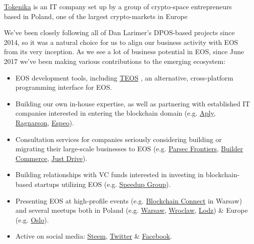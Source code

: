 \documentclass[10pt,a4paper,dateno,sigleft]{newlfm} %
\begin{document}
\begin{newlfm}


\href{http://tokenika.io/}{Tokenika} is an IT company set up by a group of crypto-space entrepreneurs based in Poland, one of the largest crypto-markets in Europe

We've been closely following all of Dan Larimer's DPOS-based projects since 2014, so it was a natural choice for us to align our business activity with EOS from its very inception. As we see a lot of business potential in EOS, since June 2017 we've been making various contributions to the emerging ecosystem:

\begin{itemize}
\item EOS development tools, including \href{https://github.com/tokenika/teos}{TEOS} , an alternative, cross-platform programming interface for EOS.
\item Building our own in-house expertise, as well as partnering with established IT companies interested in entering the blockchain domain (e.g. \href{https://aply.eu/}{Aply}, \href{https://ragnarson.com/}{Ragnarson}, \href{http://espeo.eu/}{Espeo}).
\item Consultation services for companies seriously considering building or migrating their large-scale businesses to EOS (e.g. \href{http://parsecfrontiers.com/}{Parsec Frontiers}, \href{http://buildercommerce.com/}{Builder Commerce}, \href{http://justdrive.co/}{Just Drive}).
\item Building relationships with VC funds interested in investing in blockchain-based startups utilizing EOS (e.g. \href{http://speedupgroup.com/en/}{Speedup Group}).
\item Presenting EOS at high-profile events (e.g. \href{http://connectwarsaw.org/}{Blockchain Connect} in Warsaw) and several meetups both in Poland (e.g. \href{https://www.facebook.com/events/903326303125907/}{Warsaw}, \href{https://www.meetup.com/Wroclaw-Blockchain-Meetup/events/246349912/}{Wroclaw}, \href{https://www.facebook.com/events/160585741214328/}{Lodz}) \& Europe (e.g. \href{https://steemit.com/eos/@bitspace/bitspace-hosts-scandinavia-s-first-ever-eos-meetup-in-oslo-norway}{Oslo}).
\item Active on social media: \href{https://steemit.com/@tokenika}{Steem}, \href{https://twitter.com/tokenika_io}{Twitter} \& \href{https://www.facebook.com/groups/EOSPolska/}{Facebook}.
\end{itemize} 
 

\end{newlfm}
\end{document}
